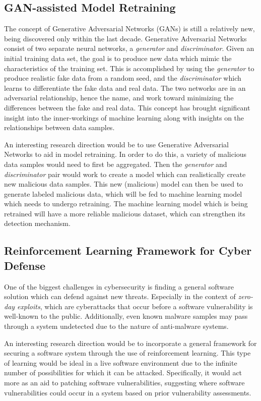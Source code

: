 \documentclass[11pt,conference]{IEEEtran}
\begin{document}
\subsection{GAN-assisted Model Retraining}
The concept of Generative Adversarial Networks (GANs) is still a relatively
new, being discovered only within the last decade. Generative Adversarial
Networks consist of two separate neural networks, a \emph{generator}
and \emph{discriminator}. Given an initial training data set, the goal is to
produce new data which mimic the characteristics of the training set. This is
accomplished by using the \emph{generator} to produce realistic fake data from
a random seed, and the \emph{discriminator} which learns to differentiate the
fake data and real data. The two networks are in an adversarial relationship,
hence the name, and work toward minimizing the differences between the fake and
real data. This concept has brought significant insight into the inner-workings
of machine learning along with insights on the relationships between data
samples.

An interesting research direction would be to use Generative Adversarial
Networks to aid in model retraining. In order to do this, a
variety of malicious data samples would need to first be aggregated. Then the
\emph{generator} and \emph{discriminator} pair would work to create a model
which can realistically create new malicious data samples. This new (malicious)
model can then be used to generate labeled malicious data, which will be fed to
machine learning model which needs to undergo retraining. The machine learning
model which is being retrained will have a more reliable malicious dataset,
which can strengthen its detection mechanism.

\subsection{Reinforcement Learning Framework for Cyber Defense}
One of the biggest challenges in cybersecurity is finding a general software
solution which can defend against new threats. Especially in the
context of \emph{zero-day exploits}, which are cyberattacks that occur before a
software vulnerability is well-known to the public. Additionally, even known
malware samples may pass through a system undetected due to the nature of
anti-malware systems.

An interesting research direction would be to incorporate a general framework
for securing a software system through the use of reinforcement learning. This
type of learning would be ideal in a live software environment due to the
infinite number of possibilities for which it can be attacked. Specifically, it
would act more as an aid to patching software vulnerabilities, suggesting where
software vulnerabilities could occur in a system based on prior vulnerability
assessments.
\end{document}
